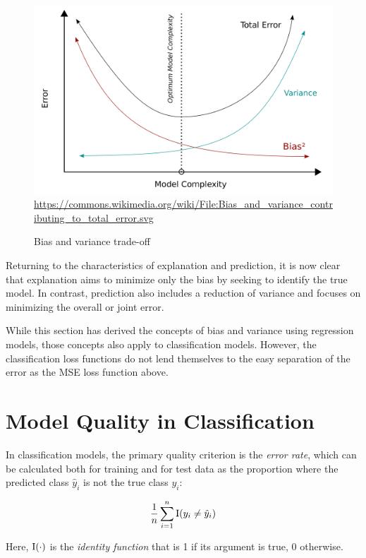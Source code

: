 \begin{figure}
\centering
\centering
\includegraphics[width=.75\textwidth]{bias_variance.png}\\

\scriptsize \url{https://commons.wikimedia.org/wiki/File:Bias_and_variance_contributing_to_total_error.svg}
\caption{Bias and variance trade-off}
\label{fig:biasvariancetradeoff}
\end{figure}

Returning to the characteristics of explanation and prediction, it is now clear that explanation aims to minimize only the bias by seeking to identify the true model. In contrast, prediction also includes a reduction of variance and focuses on minimizing the overall or joint error.

While this section has derived the concepts of bias and variance using regression models, those concepts also apply to classification models. However, the classification loss functions do not lend themselves to the easy separation of the error as the MSE loss function above.

\section{Model Quality in Classification}

In classification models, the primary quality criterion is the \emph{error rate}, which can be calculated both for training and for test data as the proportion where the predicted class $\hat{y}_i$ is not the true class $y_i$:

\begin{align*}
\frac{1}{n}\sum^n_{i=1} \operatorname{I}(y_i \neq \hat{y}_i)
\end{align*}

\noindent Here, $\operatorname{I}(\cdot)$ is the \emph{identity function} that is 1 if its argument is true, 0 otherwise.

